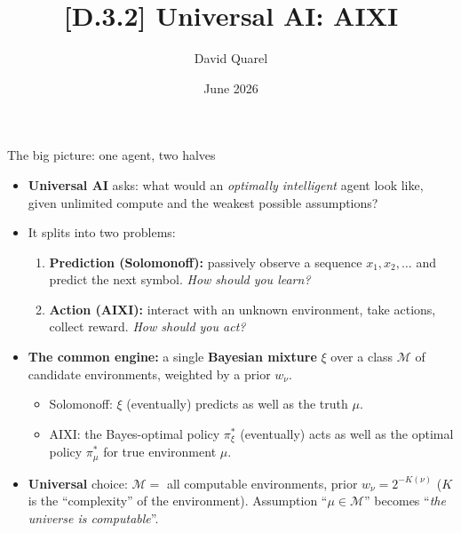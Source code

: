 \documentclass[10pt,aspectratio=169]{beamer}
\newcommand{\cM}{\mathcal{M}}
\begin{document}
\title[AIXI: a speedrun]{[D.3.2] Universal AI: AIXI}
\author[David Quarel]{David Quarel}
\date{June 2026}

\frame{\titlepage}

\begin{frame}{The big picture: one agent, two halves}
\begin{itemize}
    \item \textbf{Universal AI} asks: what would an \emph{optimally intelligent} agent look like, given unlimited compute and the weakest possible assumptions?
    \pause
    \item It splits into two problems:
    \begin{enumerate}
        \item \textbf{Prediction (Solomonoff):} passively observe a sequence $x_1, x_2, \ldots$ and predict the next symbol. \emph{How should you learn?}
        \pause
        \item \textbf{Action (AIXI):} interact with an unknown environment, take actions, collect reward. \emph{How should you act?}
    \end{enumerate}
    \pause
    \item \textbf{The common engine:} a single \textbf{Bayesian mixture} $\xi$ over a class $\cM$ of candidate environments, weighted by a prior $w_\nu$.
    \begin{itemize}
        \item Solomonoff: $\xi$ (eventually) predicts as well as the truth $\mu$.
        \item AIXI: the Bayes-optimal policy $\pi_\xi^*$ (eventually) acts as well as the optimal policy $\pi_\mu^*$ for true environment $\mu$.
    \end{itemize}
    \pause
    \item \textbf{Universal} choice: $\cM=$ all computable environments, prior $w_\nu = 2^{-K(\nu)}$ ($K$ is the ``complexity'' of the environment). Assumption ``$\mu\in\cM$'' becomes ``\emph{the universe is computable}''.
\end{itemize}
\end{frame}
\end{document}
